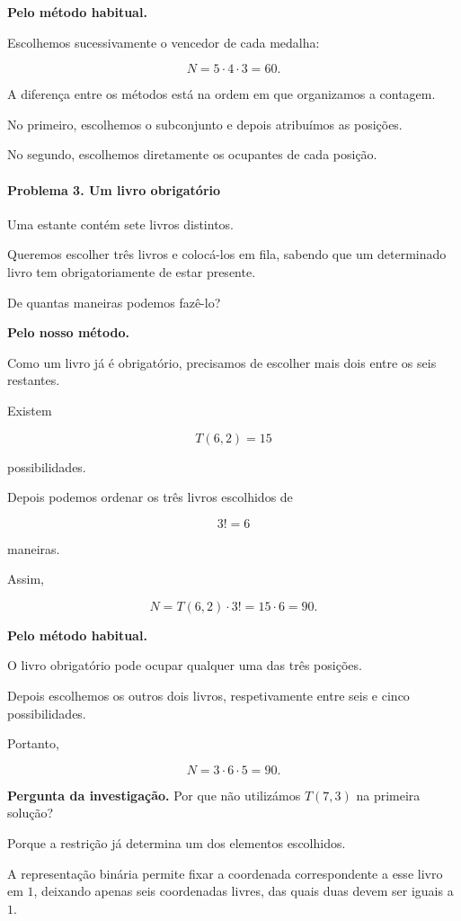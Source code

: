 \documentclass[11pt,a4paper,oneside]{book}
\newcommand{\Pergunta}[1]{\begin{perguntabox}\textbf{Pergunta da investigação.} #1\end{perguntabox}}
\begin{document}
\textbf{Pelo método habitual.}

Escolhemos sucessivamente o vencedor
de cada medalha:

\[
N=5\cdot4\cdot3=60.
\]

A diferença entre os métodos está na ordem
em que organizamos a contagem.

No primeiro, escolhemos o subconjunto e depois
atribuímos as posições.

No segundo, escolhemos diretamente
os ocupantes de cada posição.

\paragraph{Problema 3. Um livro obrigatório}

Uma estante contém sete livros distintos.

Queremos escolher três livros e colocá-los
em fila, sabendo que um determinado livro
tem obrigatoriamente de estar presente.

De quantas maneiras podemos fazê-lo?

\textbf{Pelo nosso método.}

Como um livro já é obrigatório,
precisamos de escolher mais dois entre
os seis restantes.

Existem

\[
T(6,2)=15
\]

possibilidades.

Depois podemos ordenar os três livros
escolhidos de

\[
3!=6
\]

maneiras.

Assim,

\[
N=T(6,2)\cdot3!=15\cdot6=90.
\]

\textbf{Pelo método habitual.}

O livro obrigatório pode ocupar
qualquer uma das três posições.

Depois escolhemos os outros dois livros,
respetivamente entre seis e cinco possibilidades.

Portanto,

\[
N=3\cdot6\cdot5=90.
\]

\Pergunta{Por que não utilizámos $T(7,3)$
na primeira solução?}

Porque a restrição já determina um dos
elementos escolhidos.

A representação binária permite fixar
a coordenada correspondente a esse livro
em $1$, deixando apenas seis coordenadas
livres, das quais duas devem ser iguais a $1$.
\end{document}
